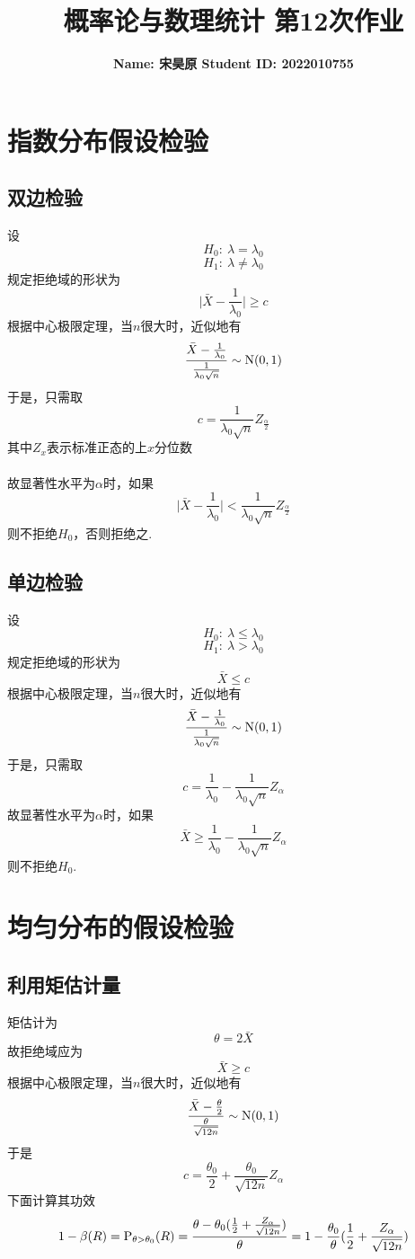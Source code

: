 \documentclass{article}
\title{\bf\Large  概率论与数理统计 第12次作业}
\author{\bf Name: 宋昊原 \qquad Student ID: 2022010755}
\begin{document}
\begin{CJK}{UTF8}{gbsn}
\maketitle
\section{指数分布假设检验}
\subsection{双边检验}
设
$$ H_{0}:\ \lambda = \lambda_{0} $$
$$ H_{1}:\ \lambda \neq \lambda_{0} $$
规定拒绝域的形状为
$$ \vert\bar{X}-\frac{1}{\lambda_{0}}\vert\geq c$$
根据中心极限定理，当$n$很大时，近似地有
$$ \frac{\bar{X}-\frac{1}{\lambda_{0}}}{\frac{1}{\lambda_{0}\sqrt{n}}}\sim {\rm N}(0,1)$$
于是，只需取
$$ c = \frac{1}{\lambda_{0}\sqrt{n}}Z_{\frac{\alpha}{2}}$$
其中$Z_{x}$表示标准正态的上$x$分位数
\\\\故显著性水平为$\alpha$时，如果
$$ \vert\bar{X}-\frac{1}{\lambda_{0}}\vert < \frac{1}{\lambda_{0}\sqrt{n}}Z_{\frac{\alpha}{2}}$$
则不拒绝$H_{0}$，否则拒绝之.
\subsection{单边检验}
设
$$ H_{0}:\ \lambda \leq \lambda_{0} $$
$$ H_{1}:\ \lambda > \lambda_{0} $$
规定拒绝域的形状为
$$ \bar{X}\leq c$$
根据中心极限定理，当$n$很大时，近似地有
$$ \frac{\bar{X}-\frac{1}{\lambda_{0}}}{\frac{1}{\lambda_{0}\sqrt{n}}}\sim {\rm N}(0,1)$$
于是，只需取
$$ c = \frac{1}{\lambda_{0}}-\frac{1}{\lambda_{0}\sqrt{n}}Z_{\alpha}$$
故显著性水平为$\alpha$时，如果
$$ \bar{X}\geq\frac{1}{\lambda_{0}}-\frac{1}{\lambda_{0}\sqrt{n}}Z_{\alpha}$$
则不拒绝$H_{0}$.
\section{均匀分布的假设检验}
\subsection{利用矩估计量}
矩估计为
$$ \theta = 2\bar{X}$$
故拒绝域应为
$$ \bar{X} \geq c $$
根据中心极限定理，当$n$很大时，近似地有
$$ \frac{\bar{X}-\frac{\theta}{2}}{\frac{\theta}{\sqrt{12n}}}\sim {\rm N}(0,1)$$
于是
$$ c = \frac{\theta_{0}}{2} + \frac{\theta_{0}}{\sqrt{12n}}Z_{\alpha} $$
下面计算其功效
$$ 1-\beta(R)={\rm P}_{\theta>\theta_{0}}(R)=\frac{\theta-\theta_{0}(\frac{1}{2}+\frac{Z_{\alpha}}{\sqrt{12n}})}{\theta}=1-\frac{\theta_{0}}{\theta}(\frac{1}{2}+\frac{Z_{\alpha}}{\sqrt{12n}})$$

\end{CJK}
\end{document}
